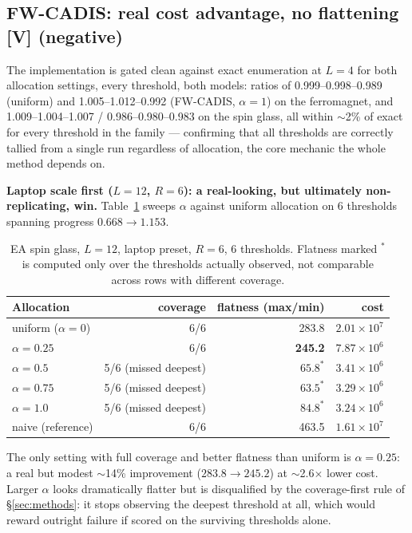 \documentclass[a4paper,fleqn]{cas-sc}
\begin{document}
\subsection{FW-CADIS: real cost advantage, no flattening \textbf{[V] (negative)}}\label{sec:fwcadis}
The implementation is gated clean against exact enumeration at $L=4$ for both allocation
settings, every threshold, both models: ratios of 0.999--0.998--0.989 (uniform) and
1.005--1.012--0.992 (FW-CADIS, $\alpha=1$) on the ferromagnet, and 1.009--1.004--1.007 /
0.986--0.980--0.983 on the spin glass, all within $\sim$2\% of exact for every threshold in
the family --- confirming that all thresholds are correctly tallied from a single run
regardless of allocation, the core mechanic the whole method depends on.

\textbf{Laptop scale first ($L=12$, $R=6$): a real-looking, but ultimately non-replicating,
	win.} Table~\ref{tab:fwlaptop} sweeps $\alpha$ against uniform allocation on 6 thresholds
spanning progress $0.668\to1.153$.

\begin{table}[H]
\centering\small
\caption{EA spin glass, $L=12$, laptop preset, $R=6$, 6 thresholds. Flatness marked $^*$ is
	computed only over the thresholds actually observed, not comparable across rows with
	different coverage.}
\label{tab:fwlaptop}
\begin{tabular}{lrrr}
	\toprule
	Allocation & coverage & flatness (max/min) & cost \\
	\midrule
	uniform ($\alpha=0$) & 6/6 & 283.8 & $2.01\times10^{7}$ \\
	$\alpha=0.25$ & 6/6 & \textbf{245.2} & $7.87\times10^{6}$ \\
	$\alpha=0.5$ & 5/6 (missed deepest) & $65.8^*$ & $3.41\times10^{6}$ \\
	$\alpha=0.75$ & 5/6 (missed deepest) & $63.5^*$ & $3.29\times10^{6}$ \\
	$\alpha=1.0$ & 5/6 (missed deepest) & $84.8^*$ & $3.24\times10^{6}$ \\
	naive (reference) & 6/6 & 463.5 & $1.61\times10^{7}$ \\
	\bottomrule
\end{tabular}
\end{table}

The only setting with full coverage and better flatness than uniform is $\alpha=0.25$: a
real but modest $\sim$14\% improvement ($283.8\to245.2$) at $\sim$2.6$\times$ lower cost.
Larger $\alpha$ looks dramatically flatter but is disqualified by the coverage-first rule
of \S\ref{sec:methods}: it stops observing the deepest threshold at all, which would reward
outright failure if scored on the surviving thresholds alone.
\end{document}
